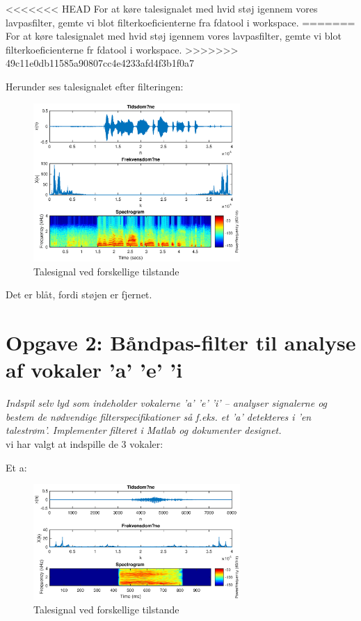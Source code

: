 \documentclass[a4paper]{report}
\begin{document}
<<<<<<< HEAD
For at køre talesignalet med hvid støj igennem vores lavpasfilter, gemte vi blot filterkoeficienterne fra fdatool i workspace. 
=======
For at køre talesignalet med hvid støj igennem vores lavpasfilter, gemte vi blot filterkoeficienterne fr fdatool i workspace. 
>>>>>>> 49c11e0db11585a90807cc4e4233afd4f3b1f0a7

Herunder ses talesignalet efter filteringen: 

\begin{figure}[H] 
\centering
\includegraphics[width=0.7\textwidth]{grafer/opg1_filter}
\caption{Talesignal ved forskellige tilstande} \label{opg1_filter}
\end{figure}


Det er blåt, fordi støjen er fjernet.


\section*{Opgave 2: Båndpas-filter til analyse af vokaler ’a’  ’e’  ’i}
\textit{Indspil selv lyd som indeholder vokalerne ’a’  ’e’  ’i’ – analyser signalerne og bestem de nødvendige filterspecifikationer så f.eks. et ’a’ detekteres i ’en talestrøm’. Implementer filteret i Matlab og dokumenter designet.}\\


vi har valgt at indspille de 3 vokaler: 

Et a: 

\begin{figure}[H] 
\centering
\includegraphics[width=0.7\textwidth]{grafer/opg2_a}
\caption{Talesignal ved forskellige tilstande} \label{opg2_a}
\end{figure}
\end{document}
